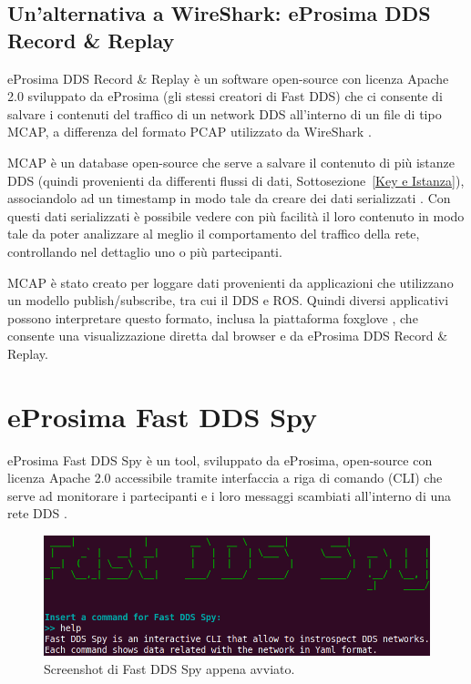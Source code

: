 \subsection{Un'alternativa a WireShark: eProsima DDS Record \& Replay}
eProsima DDS Record \& Replay è un software open-source con licenza 
Apache 2.0 sviluppato da eProsima (gli stessi creatori di Fast DDS) che 
ci consente di salvare i contenuti del traffico di un network DDS
all'interno di un file di tipo MCAP, a differenza del formato PCAP 
utilizzato da WireShark \cite{eProsimaDDSRecordeReplayDocumentation}.

MCAP è un database open-source che serve a salvare il contenuto 
di più istanze DDS (quindi provenienti da differenti flussi di dati, 
Sottosezione~\ref{Key e Istanza}), associandolo
ad un timestamp in modo tale da creare dei dati serializzati
\cite{mcap}.
Con questi dati serializzati è possibile vedere con più facilità 
il loro contenuto in modo tale da poter analizzare al meglio
il comportamento del traffico della rete, controllando nel dettaglio 
uno o più partecipanti.   

MCAP è stato creato per loggare dati provenienti da applicazioni 
che utilizzano un modello publish/subscribe, tra cui il DDS e ROS.
Quindi diversi applicativi possono interpretare questo formato, 
inclusa la piattaforma 
foxglove \cite{foxglove}, 
che consente una visualizzazione diretta dal browser e da
eProsima DDS Record \& Replay.


\section{eProsima Fast DDS Spy}
eProsima Fast DDS Spy è un tool, sviluppato da eProsima, 
open-source con licenza Apache 2.0 accessibile
tramite interfaccia a riga di comando (CLI) che serve ad monitorare i partecipanti
e i loro messaggi scambiati all'interno di una rete DDS \cite{FastDDSSpy}. 

\begin{figure}[H]
    \centering
    \includegraphics[width=15.2cm, keepaspectratio]{img/fastddsspyintro.png}
    \caption{Screenshot di Fast DDS Spy appena avviato.}
    \label{fastddsspyintro}
\end{figure}

